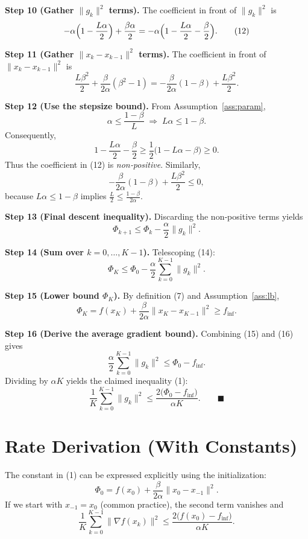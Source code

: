 \documentclass{article}
\newcommand{\grad}{\nabla}
\begin{document}
\noindent\textbf{Step 10 (Gather $\|g_{k}\|^{2}$ terms).}  
The coefficient in front of $\|g_{k}\|^{2}$ is
\[
-\alpha\Bigl(1-\frac{L\alpha}{2}\Bigr)+\frac{\beta\alpha}{2}
= -\alpha\Bigl(1-\frac{L\alpha}{2}-\frac{\beta}{2}\Bigr).
\tag{12}
\]

\noindent\textbf{Step 11 (Gather $\|x_{k}-x_{k-1}\|^{2}$ terms).}  
The coefficient in front of $\|x_{k}-x_{k-1}\|^{2}$ is
\[
\frac{L\beta^{2}}{2}+\frac{\beta}{2\alpha}(\beta^{2}-1)
= -\frac{\beta}{2\alpha}(1-\beta) +\frac{L\beta^{2}}{2}.
\tag{13}
\]

\noindent\textbf{Step 12 (Use the stepsize bound).}  
From Assumption~\ref{ass:param},
\[
\alpha\le\frac{1-\beta}{L}
\;\Longrightarrow\;
L\alpha\le 1-\beta.
\]
Consequently,
\[
1-\frac{L\alpha}{2}-\frac{\beta}{2}
\ge \frac{1}{2}\bigl(1-L\alpha-\beta\bigr)\ge0.
\]
Thus the coefficient in (12) is \emph{non‑positive}.  
Similarly,
\[
-\frac{\beta}{2\alpha}(1-\beta)+\frac{L\beta^{2}}{2}
\le 0,
\]
because $L\alpha\le 1-\beta$ implies $\frac{L}{2}\le\frac{1-\beta}{2\alpha}$.

\noindent\textbf{Step 13 (Final descent inequality).}  
Discarding the non‑positive terms yields
\[
\Phi_{k+1}\le\Phi_{k}-\frac{\alpha}{2}\|g_{k}\|^{2}.
\tag{14}
\]

\noindent\textbf{Step 14 (Sum over $k=0,\dots,K-1$).}  
Telescoping (14):
\[
\Phi_{K}\le\Phi_{0}-\frac{\alpha}{2}\sum_{k=0}^{K-1}\|g_{k}\|^{2}.
\tag{15}
\]

\noindent\textbf{Step 15 (Lower bound $\Phi_{K}$).}  
By definition (7) and Assumption~\ref{ass:lb},
\[
\Phi_{K}=f(x_{K})+\frac{\beta}{2\alpha}\|x_{K}-x_{K-1}\|^{2}\ge f_{\inf}.
\tag{16}
\]

\noindent\textbf{Step 16 (Derive the average gradient bound).}  
Combining (15) and (16) gives
\[
\frac{\alpha}{2}\sum_{k=0}^{K-1}\|g_{k}\|^{2}
\le \Phi_{0}-f_{\inf}.
\]
Dividing by $\alpha K$ yields the claimed inequality (1):
\[
\frac{1}{K}\sum_{k=0}^{K-1}\|g_{k}\|^{2}
\le \frac{2\bigl(\Phi_{0}-f_{\inf}\bigr)}{\alpha K}.
\qquad\blacksquare
\]

\section*{Rate Derivation (With Constants)}
The constant in (1) can be expressed explicitly using the initialization:
\[
\Phi_{0}=f(x_{0})+\frac{\beta}{2\alpha}\|x_{0}-x_{-1}\|^{2}.
\]
If we start with $x_{-1}=x_{0}$ (common practice), the second term vanishes and
\[
\frac{1}{K}\sum_{k=0}^{K-1}\|\grad f(x_{k})\|^{2}
\le\frac{2\bigl(f(x_{0})-f_{\inf}\bigr)}{\alpha K}.
\]
\end{document}
